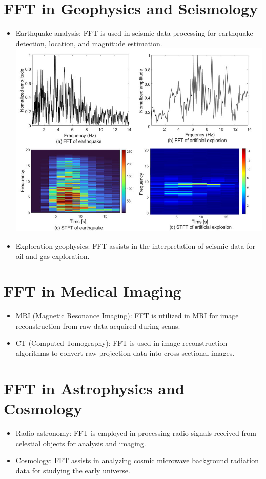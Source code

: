 \documentclass{report}
\begin{document}
\section{FFT in Geophysics and Seismology}
    \begin{itemize}[]
        \item Earthquake analysis: FFT is used in seismic data processing for earthquake detection, location, and magnitude estimation.\\
        \includegraphics[scale=0.5]{seismic_signal_1.jpg}
        \item Exploration geophysics: FFT assists in the interpretation of seismic data for oil and gas exploration.
    \end{itemize}
\section{FFT in Medical Imaging}
    \begin{itemize}[]
        \item MRI (Magnetic Resonance Imaging): FFT is utilized in MRI for image reconstruction from raw data acquired during scans.
        \item CT (Computed Tomography): FFT is used in image reconstruction algorithms to convert raw projection data into cross-sectional images.
    \end{itemize}
\section{FFT in Astrophysics and Cosmology}
    \begin{itemize}[]
        \item Radio astronomy: FFT is employed in processing radio signals received from celestial objects for analysis and imaging.
        \item Cosmology: FFT assists in analyzing cosmic microwave background radiation data for studying the early universe.
    \end{itemize}
\end{document}
